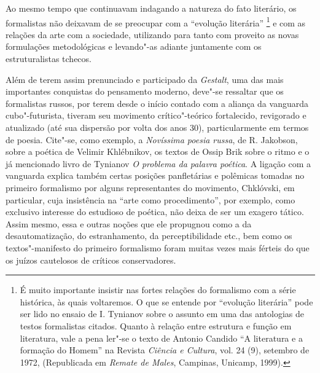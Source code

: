 Ao mesmo tempo que continuavam indagando a natureza do fato literário,
os formalistas não deixavam de se preocupar com a ``evolução literária''
\footnote{É muito importante insistir nas fortes relações do formalismo
  com a série histórica, às quais voltaremos. O que se entende por
  ``evolução literária'' pode ser lido no ensaio de I. Tynianov sobre o
  assunto em uma das antologias de testos formalistas citados. Quanto à
  relação entre estrutura e função em literatura, vale a pena ler"-se o
  texto de Antonio Candido ``A literatura e a formação do
  Homem'' na Revista \emph{Ciência e Cultura}, vol. 24 (9), setembro de
  1972, (Republicada em \emph{Remate de Males}, Campinas, Unicamp,
  1999).} e com as relações da arte com a sociedade, utilizando para
tanto com proveito as novas formulações metodológicas e levando"-as
adiante juntamente com os estruturalistas tchecos.

Além de terem assim prenunciado e participado da \emph{Gestalt}, uma das
mais importantes conquistas do pensamento moderno, deve"-se ressaltar que
os formalistas russos, por terem desde o início contado com a aliança da
vanguarda cubo"-futurista, tiveram seu movimento crítico"-teórico
fortalecido, revigorado e atualizado (até sua dispersão por volta dos
anos 30), particularmente em termos de poesia. Cite"-se, como exemplo, a
\emph{Novíssima poesia russa}, de R. Jakobson, sobre a poética de Velimir
Khlébnikov, os textos de Ossip Brik sobre o ritmo e o já mencionado
livro de Tynianov \emph{O problema da palavra poética}. A ligação com a
vanguarda explica também certas posições panfletárias e polêmicas
tomadas no primeiro formalismo por alguns representantes do movimento,
Chklóvski, em particular, cuja insistência na ``arte como
procedimento'', por exemplo, como exclusivo interesse do estudioso de
poética, não deixa de ser um exagero tático. Assim mesmo, essa e outras noções que ele propugnou como a
da desautomatização, do estranhamento, da perceptibilidade etc., bem
como os textos"-manifesto do primeiro formalismo foram muitas vezes mais
férteis do que os juízos cautelosos de críticos conservadores.

